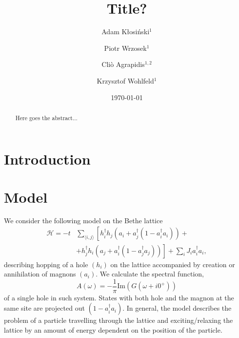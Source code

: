 \documentclass[%
 reprint,
 amsmath,amssymb,
 aps,
prb,
floatfix,
]{revtex4-1}
\newcommand{\mean}[1]{\langle#1\rangle}
\begin{document}


\title{Title?}


\author{Adam K\l{}osi\'n{}ski$^1$}
\author{Piotr Wrzosek$^1$}
\author{Cli\`o{} Agrapidis$^{1,2}$}
\author{Krzysztof Wohlfeld$^1$}
 
%


\date{\today}%

\begin{abstract}
Here goes the abstract...

\end{abstract}

\maketitle


\section{\label{sec:intro}Introduction}

\section{Model}

We consider the following model on the Bethe lattice
\begin{equation}\label{model}
\begin{aligned}
\mathcal{H} = -t &\sum_{\mean{i,j}} \left[ h_i^\dag h_j \left(a_i + a_j^\dag (1 - a_i^\dag a_i) \right)\right. + \\
&+ \left. h_j^\dag h_i \left(a_j + a_i^\dag (1 - a_j^\dag a_j) \right)\right] + \sum_i J_i a_i^\dag a_i,
\end{aligned}
\end{equation}
describing hopping of a hole $(h_i)$ on the lattice accompanied by creation or annihilation of magnons $(a_i)$. We calculate the spectral function,
\begin{equation}
A(\omega) = -\frac{1}{\pi}\text{Im}\!\left(G(\omega + i0^+)\right)
\end{equation}
of a single hole in such system. States with both hole and the magnon at the same site are projected out $(1 - a_i^\dag a_i)$. In general, the model describes the problem of a particle travelling through the lattice and exciting/relaxing the lattice by an amount of energy dependent on the position of the particle. 
\end{document}
